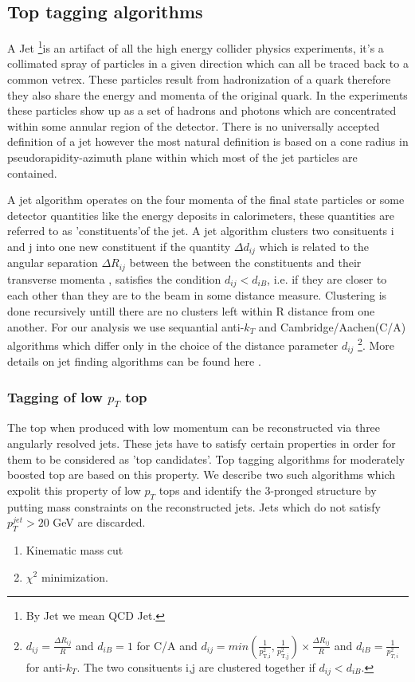 \documentclass[12pt,a4paper]{article}		%
\begin{document}
 
\subsection{Top tagging algorithms}

	A Jet \footnote{By Jet we mean QCD Jet.}is an artifact of all the high energy collider physics experiments, it's a collimated spray of particles in a given direction which can all be traced back to a common vetrex. These particles result from hadronization of a quark therefore they also share the energy and momenta of the original quark. In the experiments these particles show up as a set of hadrons and photons which are concentrated within some annular region of the detector. There is no universally accepted definition of a jet however the most natural definition is based on a cone radius in pseudorapidity-azimuth plane within which most of the jet particles are contained.
	
	A jet algorithm operates on the four momenta of the final state particles or some detector quantities like the energy deposits in calorimeters, these quantities are referred to as 'constituents'of the jet. A jet algorithm clusters two consituents i and j into one new constituent if the quantity $\Delta d_{ij}$ which is related to the angular separation $\Delta R_{ij}$ between the  between the constituents and their transverse momenta , satisfies the condition $d_{ij} < d_{iB}$, i.e. if they are closer to each other than they are to the beam in some distance measure. Clustering is done recursively untill there are no clusters left within R distance from one another. For our analysis we use sequantial anti-$k_T$ and Cambridge/Aachen(C/A) algorithms which differ only in the choice of the distance parameter $d_{ij}$ \footnote{ $d_{ij} = \frac{\Delta R_{ij}}{R}$ and $d_{iB} = 1 $ for C/A and $d_{ij} = min \left( \frac{1}{p_{\text{T,i}}^2}, \frac{1}{p_{\text{T,j}}^2} \right)\times \frac{ \Delta R_{ij}}{R}$ and $ d_{iB} = \frac{1}{p_{T,i}^2} $ for anti-$k_T$. The two consituents i,j are clustered together if $d_{ij} < d_{iB}$.}. More details on jet finding algorithms can be found here \cite{jet-topography}.
	
	\subsubsection{Tagging of low $p_T$ top}
	The top when produced with low momentum can be reconstructed via three angularly resolved jets. These jets have to satisfy certain properties in order for them to be considered as 'top candidates'. Top tagging algorithms for moderately boosted top are based on this property. We describe two such algorithms which expolit this property of low $p_T$ tops and identify the 3-pronged structure by putting mass constraints on the reconstructed jets. Jets which do not satisfy $p_T^{jet} > 20$ GeV are discarded.   
	\begin{enumerate}
		\item Kinematic mass cut
		\item $\chi^2$ minimization. 
	\end{enumerate}		
	 	
\end{document}
